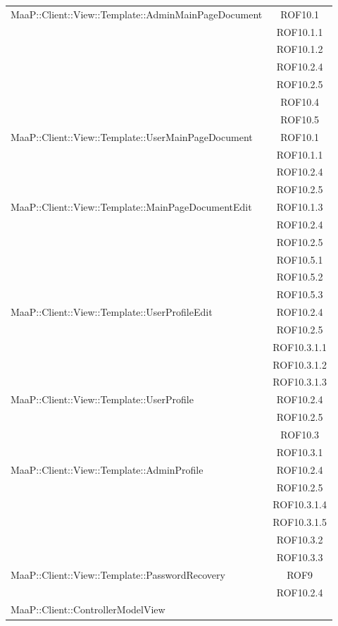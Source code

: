 \begin{center}
\begin{longtable}{|p{0.8\linewidth}|c|}
\midrule 
MaaP::Client::View::Template::AdminMainPageDocument
& ROF10.1\\
& ROF10.1.1\\
& ROF10.1.2\\
& ROF10.2.4\\
& ROF10.2.5\\
& ROF10.4\\
& ROF10.5\\


\midrule 
MaaP::Client::View::Template::UserMainPageDocument
& ROF10.1\\
& ROF10.1.1\\
& ROF10.2.4\\
& ROF10.2.5\\


\midrule 
MaaP::Client::View::Template::MainPageDocumentEdit
& ROF10.1.3\\
& ROF10.2.4\\
& ROF10.2.5\\
& ROF10.5.1\\
& ROF10.5.2\\
& ROF10.5.3\\


\midrule 
MaaP::Client::View::Template::UserProfileEdit
& ROF10.2.4\\
& ROF10.2.5\\
& ROF10.3.1.1\\
& ROF10.3.1.2\\
& ROF10.3.1.3\\

\midrule 
MaaP::Client::View::Template::UserProfile
& ROF10.2.4\\
& ROF10.2.5\\
& ROF10.3\\
& ROF10.3.1\\

\midrule 
MaaP::Client::View::Template::AdminProfile
& ROF10.2.4\\
& ROF10.2.5\\
& ROF10.3.1.4\\
& ROF10.3.1.5\\
& ROF10.3.2\\
& ROF10.3.3\\


\midrule 
MaaP::Client::View::Template::PasswordRecovery
& ROF9\\
& ROF10.2.4\\

\midrule 
MaaP::Client::ControllerModelView
& \\


\end{longtable}
\end{center}
